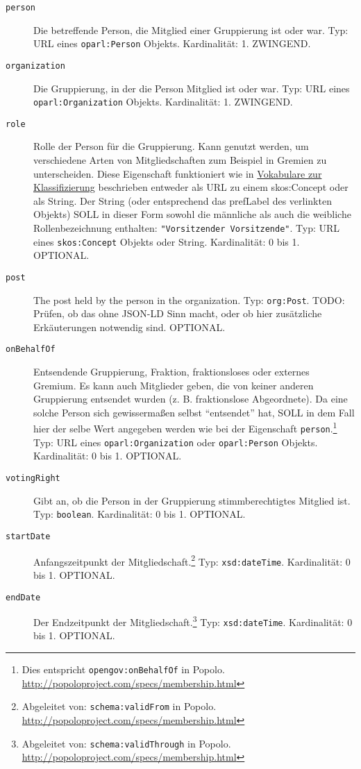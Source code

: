 \documentclass[,a4paper]{article}
\begin{document}
\begin{description}
\item[\texttt{person}]
Die betreffende Person, die Mitglied einer Gruppierung ist oder war.
Typ: URL eines \texttt{oparl:Person} Objekts. Kardinalität: 1. ZWINGEND.
\item[\texttt{organization}]
Die Gruppierung, in der die Person Mitglied ist oder war. Typ: URL eines
\texttt{oparl:Organization} Objekts. Kardinalität: 1. ZWINGEND.
\item[\texttt{role}]
Rolle der Person für die Gruppierung. Kann genutzt werden, um
verschiedene Arten von Mitgliedschaften zum Beispiel in Gremien zu
unterscheiden. Diese Eigenschaft funktioniert wie in
\hyperref[vokabulareux5fklassifizierung]{Vokabulare zur Klassifizierung}
beschrieben entweder als URL zu einem skos:Concept oder als String. Der
String (oder entsprechend das prefLabel des verlinkten Objekts) SOLL in
dieser Form sowohl die männliche als auch die weibliche
Rollenbezeichnung enthalten:
\texttt{"Vorsitzender \textbar{} Vorsitzende"}. Typ: URL eines
\texttt{skos:Concept} Objekts oder String. Kardinalität: 0 bis 1.
OPTIONAL.
\item[\texttt{post}]
The post held by the person in the organization. Typ: \texttt{org:Post}.
TODO: Prüfen, ob das ohne JSON-LD Sinn macht, oder ob hier zusätzliche
Erkäuterungen notwendig sind. OPTIONAL.
\item[\texttt{onBehalfOf}]
Entsendende Gruppierung, Fraktion, fraktionsloses oder externes Gremium.
Es kann auch Mitglieder geben, die von keiner anderen Gruppierung
entsendet wurden (z. B. fraktionslose Abgeordnete). Da eine solche
Person sich gewissermaßen selbst ``entsendet'' hat, SOLL in dem Fall
hier der selbe Wert angegeben werden wie bei der Eigenschaft
\texttt{person}.\footnote{Dies entspricht \texttt{opengov:onBehalfOf} in
  Popolo. \url{http://popoloproject.com/specs/membership.html}} Typ: URL
eines \texttt{oparl:Organization} oder \texttt{oparl:Person} Objekts.
Kardinalität: 0 bis 1. OPTIONAL.
\item[\texttt{votingRight}]
Gibt an, ob die Person in der Gruppierung stimmberechtigtes Mitglied
ist. Typ: \texttt{boolean}. Kardinalität: 0 bis 1. OPTIONAL.
\item[\texttt{startDate}]
Anfangszeitpunkt der Mitgliedschaft.\footnote{Abgeleitet von:
  \texttt{schema:validFrom} in Popolo.
  \url{http://popoloproject.com/specs/membership.html}} Typ:
\texttt{xsd:dateTime}. Kardinalität: 0 bis 1. OPTIONAL.
\item[\texttt{endDate}]
Der Endzeitpunkt der Mitgliedschaft.\footnote{Abgeleitet von:
  \texttt{schema:validThrough} in Popolo.
  \url{http://popoloproject.com/specs/membership.html}} Typ:
\texttt{xsd:dateTime}. Kardinalität: 0 bis 1. OPTIONAL.
\end{description}
\end{document}

